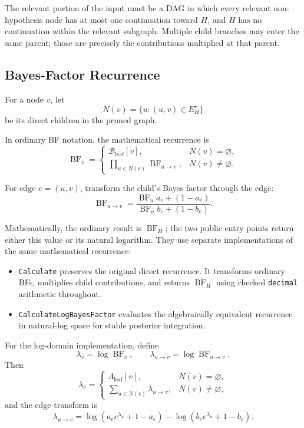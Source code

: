 \documentclass[11pt]{article}
\newcommand{\BF}{\operatorname{BF}}
\begin{document}
The relevant portion of the input must be a DAG in which every relevant
non-hypothesis node has at most one continuation toward \(H\), and \(H\) has no
continuation within the relevant subgraph.  Multiple child branches may enter
the same parent; those are precisely the contributions multiplied at that
parent.

\subsection{Bayes-Factor Recurrence}

For a node \(v\), let
\[
    N(v)
      = \{u : (u,v)\in E_H^{\star}\}
\]
be its direct children in the pruned graph.

In ordinary BF notation, the mathematical recurrence is
\[
    \BF_v
      =
      \begin{cases}
        \mathcal{B}_{\mathrm{leaf}}[v],
            & N(v)=\varnothing,\\[0.8em]
        \displaystyle
        \prod_{u\in N(v)} \BF_{u\rightarrow v},
            & N(v)\neq\varnothing.
      \end{cases}
\]

For edge \(e=(u,v)\), transform the child's Bayes factor through the edge:
\[
    \boxed{
    \BF_{u\rightarrow v}
      =
      \frac{
        \BF_u a_e + (1-a_e)
      }{
        \BF_u b_e + (1-b_e)
      }}.
\]

Mathematically, the ordinary result is \(\BF_H\); the two public entry points
return either this value or its natural logarithm.  They use separate
implementations of the same mathematical recurrence:

\begin{itemize}
    \item \texttt{Calculate} preserves the original direct recurrence.  It
          transforms ordinary BFs, multiplies child contributions, and returns
          \(\BF_H\) using checked \texttt{decimal} arithmetic throughout.
    \item \texttt{CalculateLogBayesFactor} evaluates the algebraically
          equivalent recurrence in natural-log space for stable posterior
          integration.
\end{itemize}

For the log-domain implementation, define
\[
    \lambda_v=\log\BF_v,
    \qquad
    \lambda_{u\rightarrow v}=\log\BF_{u\rightarrow v}.
\]
Then
\[
    \lambda_v
      =
      \begin{cases}
        \Lambda_{\mathrm{leaf}}[v],
            & N(v)=\varnothing,\\[0.8em]
        \displaystyle
        \sum_{u\in N(v)}\lambda_{u\rightarrow v},
            & N(v)\neq\varnothing,
      \end{cases}
\]
and the edge transform is
\[
    \boxed{
    \lambda_{u\rightarrow v}
      =
      \log\!\left(a_e e^{\lambda_u}+1-a_e\right)
      -
      \log\!\left(b_e e^{\lambda_u}+1-b_e\right)}.
\]
\end{document}
